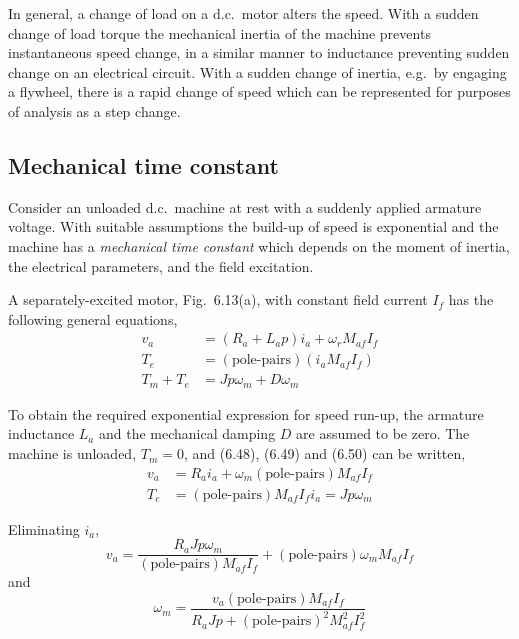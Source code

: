 \documentclass[a4paper,numbers=noenddot,12pt]{scrbook}
\begin{document}
    In general, a change of load on a d.c.\ motor alters the speed. With a sudden change of load torque the mechanical inertia of the machine prevents instantaneous speed change, in a similar manner to inductance preventing sudden change on an electrical circuit. With a sudden change of inertia, e.g.\ by engaging a flywheel, there is a rapid change of speed which can be represented for purposes of analysis as a step change.

    \subsection{Mechanical time constant}
    Consider an unloaded d.c.\ machine at rest with a suddenly applied armature voltage. With suitable assumptions the build-up of speed is exponential and the machine has a \textit{mechanical time constant} which depends on the moment of inertia, the electrical parameters, and the field excitation.

    A separately-excited motor, Fig.\ 6.13(a), with constant field current $I_f$ has the following general equations,
    \begin{align}
        v_a & = (R_a + L_a p)i_a + \omega_r M_{af} I_f \\
        T_e & = (\text{pole-pairs})(i_a M_{af} I_f) \\
        T_m + T_e & = J p \omega_m + D \omega_m  
        \label{}
    \end{align}

    To obtain the required exponential expression for speed run-up, the armature inductance $L_a$ and the mechanical damping $D$ are assumed to be zero. The machine is unloaded, $T_m = 0$, and (6.48), (6.49) and (6.50) can be written,
    \begin{align}
        v_a & = R_a i_a + \omega_m (\text{pole-pairs}) M_{af} I_f \\
        T_e & = (\text{pole-pairs})M_{af} I_f i_a = J p \omega_m
        \label{}
    \end{align}

    Eliminating $i_a$,
    \begin{equation}
        v_a = \dfrac{R_a J p \omega_m}{(\text{pole-pairs}) M_{af} I_f} + (\text{pole-pairs}) \omega_m M_{af} I_f
        \label{}
    \end{equation}
    and
    \begin{equation}
        \omega_m = \dfrac{v_a (\text{pole-pairs}) M_{af} I_f}{R_a J p + {(\text{pole-pairs})}^2 M_{af}^2 I_f^2}
        \label{}
    \end{equation}
\end{document}
